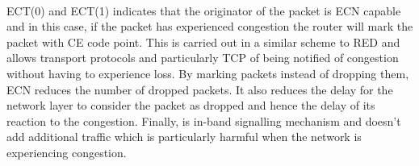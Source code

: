 \\ECT(0) and ECT(1) indicates that the originator of the packet is ECN capable and in this case, if the packet has experienced congestion the router will mark the packet with CE code point. This is carried out in a similar scheme to RED and allows transport protocols and particularly TCP of being notified of congestion without having to experience loss. 
By marking packets instead of dropping them, ECN reduces the number of dropped packets. It also reduces the delay for the network layer to consider the packet as dropped and hence the delay of its reaction to the congestion. Finally, is in-band signalling mechanism and doesn't add additional traffic which is particularly harmful when the network is experiencing congestion.




